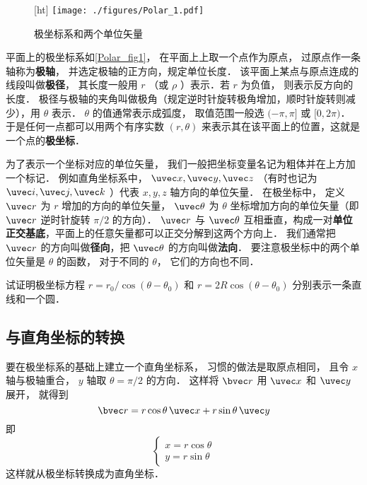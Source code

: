 
\begin{figure}\label{Polar_fig1}[ht]
\centering
\texttt{[image: ./figures/Polar\_1.pdf]}
\caption{极坐标系和两个单位矢量}
\end{figure}

平面上的极坐标系如\autoref{Polar_fig1}， 在平面上上取一个点作为原点， 过原点作一条轴称为\textbf{极轴}， 并选定极轴的正方向，规定单位长度． 该平面上某点与原点连成的线段叫做\textbf{极径}， 其长度一般用 $r$ （或 $\rho$ ）表示．若 $r$ 为负值， 则表示反方向的长度． 极径与极轴的夹角叫做极角（规定逆时针旋转极角增加，顺时针旋转则减少），用 $\theta $ 表示． $\theta$ 的值通常表示成弧度， 取值范围一般选 $(-\pi, \pi]$ 或 $[0, 2\pi)$． 于是任何一点都可以用两个有序实数 $(r,\theta)$ 来表示其在该平面上的位置，这就是一个点的\textbf{极坐标}．

为了表示一个坐标对应的单位矢量， 我们一般把坐标变量名记为粗体并在上方加一个标记． 例如直角坐标系中， $\uvec x, \uvec y, \uvec z$ （有时也记为 $\uvec i, \uvec j, \uvec k$ ）代表 $x,y,z$ 轴方向的单位矢量． 在极坐标中， 定义 $\uvec r$ 为 $r$ 增加的方向的单位矢量， $\uvec \theta$ 为 $\theta$ 坐标增加方向的单位矢量（即 $\uvec r$ 逆时针旋转 $\pi/2$ 的方向）． $\uvec r$ 与 $\uvec \theta$ 互相垂直，构成一对\textbf{单位正交基底}，平面上的任意矢量都可以正交分解到这两个方向上． 我们通常把 $\uvec r$ 的方向叫做\textbf{径向}，把 $\uvec \theta $ 的方向叫做\textbf{法向}． 要注意极坐标中的两个单位矢量是 $\theta$ 的函数， 对于不同的 $\theta$， 它们的方向也不同．

\begin{exercise}{}
试证明极坐标方程 $r = r_0/\cos(\theta - \theta_0)$ 和 $r = 2R\cos(\theta - \theta_0)$ 分别表示一条直线和一个圆．
\end{exercise}

\subsection{与直角坐标的转换}
要在极坐标系的基础上建立一个直角坐标系， 习惯的做法是取原点相同， 且令 $x$ 轴与极轴重合， $y$ 轴取 $\theta = \pi/2$ 的方向． 这样将 $\bvec r$ 用 $\uvec x$ 和 $\uvec y$ 展开， 就得到
\begin{equation}
\bvec r = r\cos\theta\,\uvec x + r\sin\theta\,\uvec y
\end{equation}
即
\begin{equation}\label{Polar_eq2}
\begin{cases}
x = r\cos\theta\\
y = r\sin\theta
\end{cases}
\end{equation}
这样就从极坐标转换成为直角坐标．

